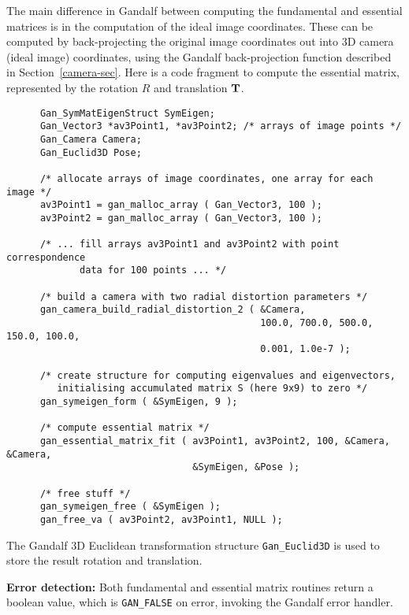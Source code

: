 The main difference in Gandalf between computing the fundamental and essential
matrices is in the computation of the ideal image coordinates.
These can be computed by back-projecting the original image coordinates
out into 3D camera (ideal image) coordinates, using the Gandalf
back-projection function described in Section~\ref{camera-sec}.
Here is a code fragment to compute the essential matrix, represented
by the rotation $R$ and translation ${\bf T}$.
\begin{verbatim}
      Gan_SymMatEigenStruct SymEigen;
      Gan_Vector3 *av3Point1, *av3Point2; /* arrays of image points */
      Gan_Camera Camera;
      Gan_Euclid3D Pose;

      /* allocate arrays of image coordinates, one array for each image */
      av3Point1 = gan_malloc_array ( Gan_Vector3, 100 );
      av3Point2 = gan_malloc_array ( Gan_Vector3, 100 );

      /* ... fill arrays av3Point1 and av3Point2 with point correspondence
             data for 100 points ... */

      /* build a camera with two radial distortion parameters */
      gan_camera_build_radial_distortion_2 ( &Camera,
                                             100.0, 700.0, 500.0, 150.0, 100.0,
                                             0.001, 1.0e-7 );
      
      /* create structure for computing eigenvalues and eigenvectors,
         initialising accumulated matrix S (here 9x9) to zero */
      gan_symeigen_form ( &SymEigen, 9 );

      /* compute essential matrix */
      gan_essential_matrix_fit ( av3Point1, av3Point2, 100, &Camera, &Camera,
                                 &SymEigen, &Pose );

      /* free stuff */
      gan_symeigen_free ( &SymEigen );
      gan_free_va ( av3Point2, av3Point1, NULL );
\end{verbatim}
The Gandalf 3D Euclidean transformation structure {\tt Gan\_Euclid3D} is
used to store the result rotation and translation.

{\bf Error detection:} Both fundamental and essential matrix routines return
a boolean value, which is {\tt GAN\_FALSE} on error, invoking the Gandalf
error handler.

